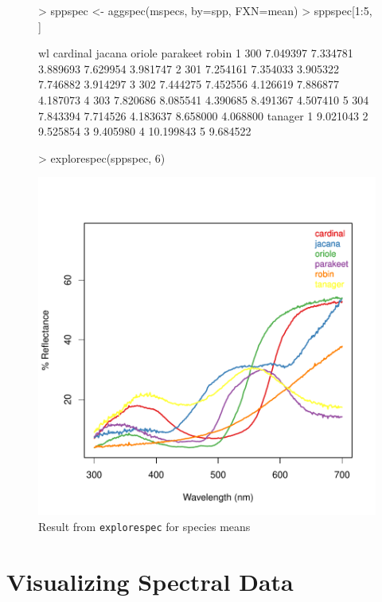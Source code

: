 \documentclass{article}
\newcommand{\code}[1]{{\tt #1}}  %
\begin{document}
\begin{figure}[H] %
\begin{center}
\begin{Schunk}
\begin{Sinput}
> sppspec <- aggspec(mspecs, by=spp, FXN=mean)
> sppspec[1:5, ]
\end{Sinput}
\begin{Soutput}
   wl cardinal   jacana   oriole parakeet    robin
1 300 7.049397 7.334781 3.889693 7.629954 3.981747
2 301 7.254161 7.354033 3.905322 7.746882 3.914297
3 302 7.444275 7.452556 4.126619 7.886877 4.187073
4 303 7.820686 8.085541 4.390685 8.491367 4.507410
5 304 7.843394 7.714526 4.183637 8.658000 4.068800
    tanager
1  9.021043
2  9.525854
3  9.405980
4 10.199843
5  9.684522
\end{Soutput}
\begin{Sinput}
> explorespec(sppspec, 6)
\end{Sinput}
\end{Schunk}
\includegraphics{pavo-exploresppmeans}
\end{center}
\caption{Result from \code{explorespec} for species means}
\label{figure:sppmeans}
\end{figure}


\section{Visualizing Spectral Data}
\end{document}
